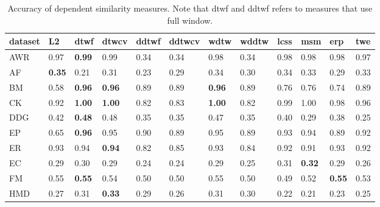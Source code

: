 \begin{table}
\centering
\caption{Accuracy of dependent similarity measures. Note that dtwf and ddtwf refers to measures that use full window.}
\label{tbl:acc-dep}
\begin{tabular}{p{0.6cm}*{11}{p{0.55cm}}}
\toprule
dataset &            L2 &          dtwf &         dtwcv &         ddtwf &        ddtwcv &          wdtw &         wddtw & lcss &           msm &           erp &           twe \\
\midrule
    AWR &          0.97 & \textbf{0.99} &          0.99 &          0.34 &          0.34 &          0.98 &          0.34 & 0.98 &          0.98 &          0.98 &          0.97 \\
     AF & \textbf{0.35} &          0.21 &          0.31 &          0.23 &          0.29 &          0.34 &          0.30 & 0.34 &          0.33 &          0.29 &          0.33 \\
     BM &          0.58 & \textbf{0.96} & \textbf{0.96} &          0.89 &          0.89 & \textbf{0.96} &          0.89 & 0.76 &          0.76 &          0.74 &          0.89 \\
     CK &          0.92 & \textbf{1.00} & \textbf{1.00} &          0.82 &          0.83 & \textbf{1.00} &          0.82 & 0.99 &          1.00 &          0.98 &          0.96 \\
    DDG &          0.42 & \textbf{0.48} &          0.48 &          0.35 &          0.35 &          0.47 &          0.35 & 0.40 &          0.29 &          0.38 &          0.25 \\
     EP &          0.65 & \textbf{0.96} &          0.95 &          0.90 &          0.89 &          0.95 &          0.89 & 0.93 &          0.94 &          0.89 &          0.92 \\
     ER &          0.93 &          0.94 & \textbf{0.94} &          0.82 &          0.85 &          0.93 &          0.84 & 0.92 &          0.91 &          0.93 &          0.92 \\
     EC &          0.29 &          0.30 &          0.29 &          0.24 &          0.24 &          0.29 &          0.25 & 0.31 & \textbf{0.32} &          0.29 &          0.26 \\
     FM &          0.55 & \textbf{0.55} &          0.54 &          0.50 &          0.50 &          0.55 &          0.50 & 0.49 &          0.52 & \textbf{0.55} &          0.53 \\
    HMD &          0.27 &          0.31 & \textbf{0.33} &          0.29 &          0.26 &          0.31 &          0.30 & 0.22 &          0.21 &          0.23 &          0.25 \\

\end{tabular}
\end{table}
